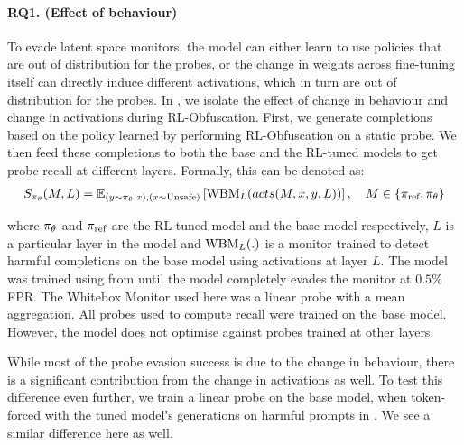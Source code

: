 \paragraph{RQ1. (Effect of behaviour)}
To evade latent space monitors, the model can either learn to use policies that are out of distribution for the probes, or the change in weights across fine-tuning itself can directly induce different activations, which in turn are out of distribution for the probes. In , we isolate the effect of change in behaviour and change in activations during RL-Obfuscation. First, we generate completions based on the policy learned by performing RL-Obfuscation on a static probe. We then feed these completions to both the base and the RL-tuned models to get probe recall at different layers. Formally, this can be denoted as: 
\begin{align}
    S_{\pi_{\theta}}(M, L) = \mathbb{E}_{(y\sim \pi_{\theta}|x), (x\sim \text{Unsafe})}\left[\text{WBM}_{L}(acts(M, x, y, L))\right], \quad M\in \{ \pi_{\text{ref}},  \pi_{\theta}\}
    \label{eq:model_layer_score}
\end{align}

where $\pi_{\theta}$ and $\pi_{\text{ref}}$ are the RL-tuned model and the base model respectively, $L$ is a particular layer in the model and $\text{WBM}_{L}(.)$ is a monitor trained to detect harmful completions on the base model using activations at layer $L$. The model was trained using \setupStatic \space from  until the model completely evades the monitor at $0.5\%$ FPR. 
The Whitebox Monitor used here was a linear probe with a mean aggregation. All probes used to compute recall were trained on the base model. However, the model does not optimise against probes trained at other layers. 

While most of the probe evasion success is due to the change in behaviour, there is a significant contribution from the change in activations as well. To test this difference even further, we train a linear probe on the base model, when token-forced with the tuned model's generations on harmful prompts in . We see a similar difference here as well.

